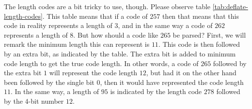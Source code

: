 The length codes are a bit tricky to use, though. Please observe table
\ref{tab:deflate-length-codes}. This table means that if a code of
$257$ then that means that this code in reality represents a length of
$3$, and in the same way a code of $262$ represents a length of
$8$. But how should a code like $265$ be parsed? First, we will remark
the minimum length this can represent is $11$. This code is then
followed by an extra bit, as indicated by the table. The extra bit is
added to minimum code length to get the true code length. In other
words, a code of $265$ followed by the extra bit $1$ will represent
the code length $12$, but had it on the other hand been followed by
the single bit $0$, then it would have represented the code length
$11$. In the same way, a length of $95$ is indicated by the length
code $278$ followed by the 4-bit number $12$.

